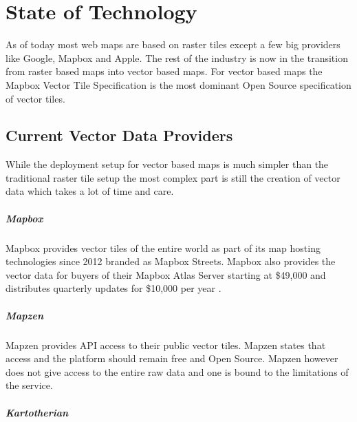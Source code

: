 \chapter{State of Technology}

As of today most web maps are based on raster tiles except a few big providers like Google, Mapbox and Apple.
The rest of the industry is now in the transition from raster based maps into vector based maps. For vector based maps the Mapbox Vector Tile Specification\cite{4_github_2015} is the most dominant Open Source specification of vector tiles.

\section{Current Vector Data Providers}

While the deployment setup for vector based maps is much simpler than
the traditional raster tile setup the most complex part is still
the creation of vector data which takes a lot of time and care.

\paragraph{Mapbox}

Mapbox provides vector tiles of the entire world as part of its
map hosting technologies since 2012 branded as Mapbox Streets\cite{5_cole_2015}. Mapbox also provides the vector data for buyers of their Mapbox Atlas Server\cite{6_mapbox_2015} starting at \$49,000 and distributes quarterly updates for \$10,000 per year .

\paragraph{Mapzen}

Mapzen provides API access to their public vector tiles\cite{7_mapzen.com_2015}.
Mapzen states that access and the platform should remain free and Open Source\cite{8_mapzen.com_2015}. Mapzen however
does not give access to the entire raw data and one is bound to
the limitations of the service.

\paragraph{Kartotherian}

